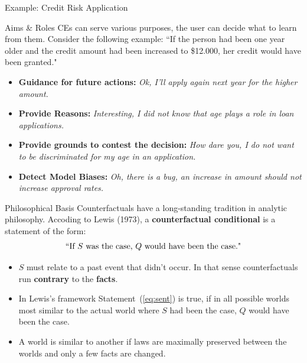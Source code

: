 \documentclass[11pt,compress,t,notes=noshow, xcolor=table]{beamer}
\begin{document}
\begin{vbframe}{Example: Credit Risk Application}
\end{vbframe}



\begin{vbframe}{Aims \& Roles}
	CEs can serve various purposes, the user can decide what to learn from them. Consider the following example:\newline
	``If the person had been one year older and the credit amount had been increased to \$12.000, her credit would have been granted."  \\[0.2cm]
	\begin{itemize}
		\itemsep1.3em
		\item \textbf{Guidance for future actions:} \textit{Ok, I'll apply again next year for the higher amount.}
		\item \textbf{Provide Reasons:} \textit{Interesting, I did not know that age plays a role in loan applications.}
		\item \textbf{Provide grounds to contest the decision:} \textit{How dare you, I do not want to be discriminated for my age in an application.}
		\item \textbf{Detect Model Biases:} \textit{Oh, there is a bug, an increase in amount should not increase approval rates.}
	\end{itemize}
\end{vbframe}

\begin{vbframe}{Philosophical Basis}
Counterfactuals have a long-standing tradition in analytic philosophy. %
Accoding to Lewis (1973), a \textbf{counterfactual conditional} is a statement of the form:	
\begin{equation}
		\textnormal{``If $S$ was the case, $Q$ would have been the case."}
		\label{eq:sent}
\end{equation}
	\begin{itemize}
		\item $S$ must relate to a past event that didn't occur. In that sense counterfactuals run \textbf{contrary} to the \textbf{facts}.
		\item In Lewis's framework Statement~(\ref{eq:sent}) is true, if in all possible worlds most similar to the actual world where $S$ had been the case, $Q$ would have been the case. 
		\item A world is similar to another if laws are maximally preserved between the worlds and only a few facts are changed.
	\end{itemize}
\end{vbframe}
\end{document}
